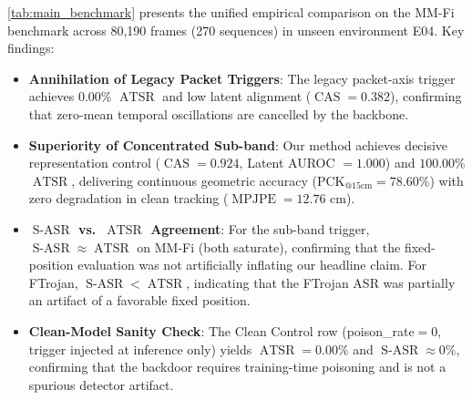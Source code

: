 \documentclass{article}
\newcommand{\MPJPE}{\operatorname{MPJPE}}
\newcommand{\SASR}{\operatorname{S-ASR}}
\newcommand{\ATSR}{\operatorname{ATSR}}
\newcommand{\CAS}{\operatorname{CAS}}
\begin{document}
\cref{tab:main_benchmark} presents the unified empirical comparison on the MM-Fi benchmark
across 80,190 frames (270 sequences) in unseen environment E04. Key findings:
\begin{itemize}
    \item \textbf{Annihilation of Legacy Packet Triggers}: The legacy packet-axis trigger
          achieves $0.00\%$ $\ATSR$ and low latent alignment ($\CAS = 0.382$), confirming that
          zero-mean temporal oscillations are cancelled by the backbone.
    \item \textbf{Superiority of Concentrated Sub-band}: Our method achieves decisive
          representation control ($\CAS = 0.924$, Latent AUROC $= 1.000$) and $100.00\%$
          $\ATSR$, delivering continuous geometric accuracy
          ($\text{PCK}_{@15\text{cm}} = 78.60\%$) with zero degradation in clean tracking
          ($\MPJPE = 12.76\text{ cm}$).
    \item \textbf{$\SASR$ vs.\ $\ATSR$ Agreement}: For the sub-band trigger, $\SASR \approx
          \ATSR$ on MM-Fi (both saturate), confirming that the fixed-position evaluation was not
          artificially inflating our headline claim. For FTrojan, $\SASR < \ATSR$, indicating
          that the FTrojan ASR was partially an artifact of a favorable fixed position.
    \item \textbf{Clean-Model Sanity Check}: The Clean Control row (poison\_rate$=0$, trigger
          injected at inference only) yields $\ATSR = 0.00\%$ and $\SASR \approx 0\%$,
          confirming that the backdoor requires training-time poisoning and is not a spurious
          detector artifact.
\end{itemize}
\end{document}
